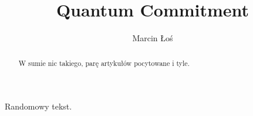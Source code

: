 \documentclass[10pt,pdftex]{article}
\begin{document}
\begin{opening}

\title{Quantum Commitment}
\author[AGH University of Science and Technology, los@student.agh.edu.pl]{Marcin Łoś}

\begin{abstract}
  W sumie nic takiego, parę artykułów pocytowane i tyle.
\end{abstract}


\end{opening}

Randomowy tekst.

\nocite{*}



\end{document}

